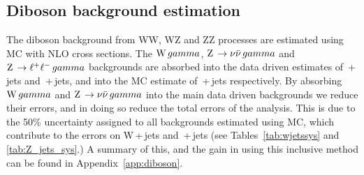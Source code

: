 \subsection{Diboson background estimation}
The diboson background from WW, WZ and ZZ processes are estimated using MC with NLO cross sections. 
The $\mathrm{W}\,gamma$, $\mathrm{Z}\, \rightarrow \nu \bar{\nu}\, gamma$ and $\mathrm{Z}\, \rightarrow \ell^{+} \ell^{-}\, gamma$ backgrounds are absorbed into the data driven estimates of \W\,+\,jets and \znunu\,+\,jets, 
and into the MC estimate of \zellell\,+\,jets respectively. 
By absorbing  $\mathrm{W}\,gamma$ and $\mathrm{Z}\, \rightarrow \nu \bar{\nu}\, gamma$ into the main data driven backgrounds we reduce their errors, 
and in doing so reduce the total errors of the analysis.
This is due to the 50\% uncertainty assigned to all backgrounds estimated using MC, which contribute to the errors on W\,+\,jets and \znunu\,+\,jets (see Tables~\ref{tab:wjetssys} and \ref{tab:Z_jets_sys}.)
A summary of this, and the gain in using this inclusive method can be found in Appendix~\ref{app:diboson}.


